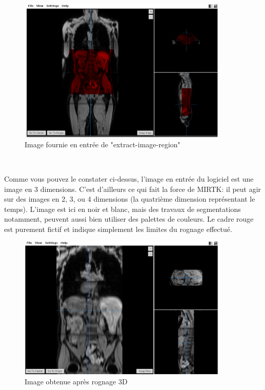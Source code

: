 \documentclass[10pt]{report}
\begin{document}
	\begin{figure}[h!]
		\begin{center}
			\includegraphics[width=10cm]{Reports/figures/mirtkextractregion1.png}
		\end{center}	
		\caption{Image fournie en entrée de "extract-image-region"}
		\label{Image fournie en entrée de "extract-image-region"}
	\end{figure}~\par
	
	Comme vous pouvez le constater ci-dessus, l'image en entrée du logiciel est une image en 3 dimensions. C'est d'ailleurs ce qui fait la force de MIRTK: il peut agir sur des images en 2, 3, ou 4 dimensions (la quatrième dimension représentant le temps). L'image est ici en noir et blanc, mais des travaux de segmentations notamment, peuvent aussi bien utiliser des palettes de couleurs. Le cadre rouge est purement fictif et indique simplement les limites du rognage effectué.
	
	\begin{figure}[h!]
		\begin{center}
			\includegraphics[width=10cm]{Reports/figures/mirtkextractregion2.png}
		\end{center}	
		\caption{Image obtenue après rognage 3D}
		\label{Image obtenue après rognage 3D}
	\end{figure}~\par 
	
\end{document}

